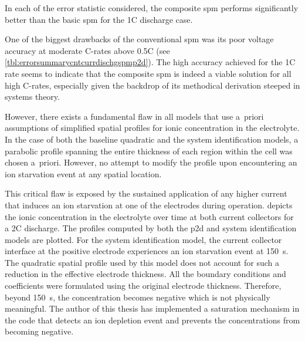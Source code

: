 

In  each of  the error  statistic considered,  the composite  \gls{spm} performs
significantly better than the basic \gls{spm} for the 1C discharge case.

One   of   the   biggest   drawbacks   of   the   conventional   \gls{spm}   was
its    poor    voltage    accuracy    at    moderate    C-rates    above    0.5C
(see \cref{tbl:errorsummarycntcurrdischgspmp2d}). The high accuracy achieved for
the 1C rate  seems to indicate that  the composite \gls{spm} is  indeed a viable
solution for all  high C-rates, especially given the backdrop  of its methodical
derivation steeped in systems theory.

However,  there exists  a  fundamental  flaw in  all  models  that use  a~priori
assumptions  of  simplified spatial  profiles  for  ionic concentration  in  the
electrolyte.  In  the  case  of  both the  baseline  quadratic  and  the  system
identification models, a parabolic profile spanning the entire thickness of each
region within the cell was chosen a~priori. However, no attempt to modify the
profile upon encountering an ion starvation event at any spatial location.

This  critical flaw  is  exposed  by the  sustained  application  of any  higher
current  that  induces  an  ion  starvation at  one  of  the  electrodes  during
operation.  depicts  the  ionic concentration  in  the
electrolyte  over time  at  both  current collectors  for  a  2C discharge.  The
profiles computed  by both  the \gls{p2d} and  system identification  models are
plotted. For  the system identification  model, the current  collector interface
at  the  positive electrode  experiences  an  ion  starvation event  at  \approx
\SI{150}{\second}. The  quadratic spatial  profile used by  this model  does not
account  for  such  a  reduction  in  the  effective  electrode  thickness.  All
the  boundary conditions  and coefficients  were formulated  using the  original
electrode  thickness.  Therefore,  beyond \SI{150}{\second},  the  concentration
becomes negative which  is not physically meaningful. The author  of this thesis
has implemented a saturation mechanism in the code that detects an ion depletion
event and prevents the concentrations from becoming negative.

